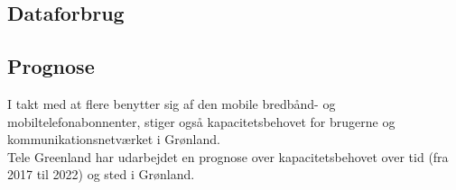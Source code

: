 \subsection{Dataforbrug}

\subsection{Prognose}
I takt med at flere benytter sig af den mobile bredbånd- og mobiltelefonabonnenter, stiger også kapacitetsbehovet for brugerne og kommunikationsnetværket i Grønland.\\
Tele Greenland har udarbejdet en prognose over kapacitetsbehovet over tid (fra 2017 til 2022) og sted i Grønland. 